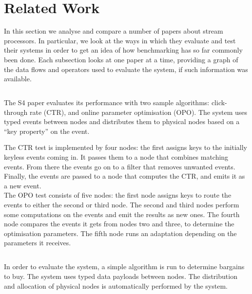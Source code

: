 \section{Related Work}
In this section we analyse and compare a number of papers about stream processors. In particular, we look at the ways in which they evaluate and test their systems in order to get an idea of how benchmarking has so far commonly been done. Each subsection looks at one paper at a time, providing a graph of the data flows and operators used to evaluate the system, if such information was available.

\subsection{}
The S4 paper evaluates its performance with two sample algorithms: click-through rate (CTR), and online parameter optimisation (OPO). The system uses typed events between nodes and distributes them to physical nodes based on a ``key property'' on the event. \\


The CTR test is implemented by four nodes: the first assigns keys to the initially keyless events coming in. It passes them to a node that combines matching events. From there the events go on to a filter that removes unwanted events. Finally, the events are passed to a node that computes the CTR, and emits it as a new event. \\

The OPO test consists of five nodes: the first node assigns keys to route the events to either the second or third node. The second and third nodes perform some computations on the events and emit the results as new ones. The fourth node compares the events it gets from nodes two and three, to determine the optimisation parameters. The fifth node runs an adaptation depending on the parameters it receives.

\subsection{}
In order to evaluate the system, a simple algorithm is run to determine bargains to buy. The system uses typed data payloads between nodes. The distribution and allocation of physical nodes is automatically performed by the system. \\

